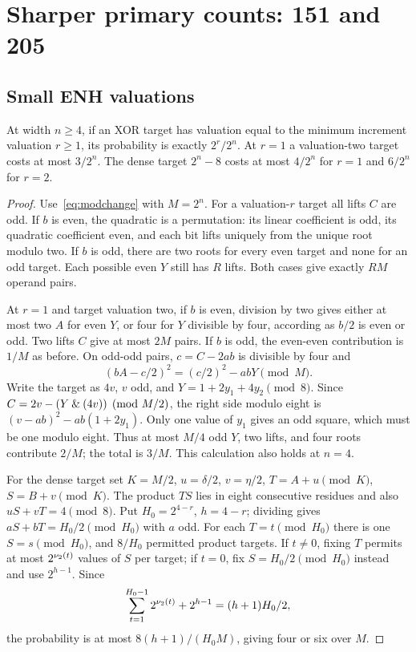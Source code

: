 \section{Sharper primary counts: 151 and 205}\label{sec:sharp}
\subsection{Small ENH valuations}
\begin{lemma}\label{lem:sharplow}
At width $n\ge4$, if an XOR target has valuation equal to the minimum increment valuation $r\ge1$, its probability is exactly $2^r/2^n$. At $r=1$ a valuation-two target costs at most $3/2^n$. The dense target $2^n-8$ costs at most $4/2^n$ for $r=1$ and $6/2^n$ for $r=2$.
\end{lemma}
\begin{proof}
Use~\eqref{eq:modchange} with $M=2^n$. For a valuation-$r$ target all lifts $C$ are odd. If $b$ is even, the quadratic is a permutation: its linear coefficient is odd, its quadratic coefficient even, and each bit lifts uniquely from the unique root modulo two. If $b$ is odd, there are two roots for every even target and none for an odd target. Each possible even $Y$ still has $R$ lifts. Both cases give exactly $RM$ operand pairs.

At $r=1$ and target valuation two, if $b$ is even, division by two gives either at most two $A$ for even $Y$, or four for $Y$ divisible by four, according as $b/2$ is even or odd. Two lifts $C$ give at most $2M$ pairs. If $b$ is odd, the even-even contribution is $1/M$ as before. On odd-odd pairs, $c=C-2ab$ is divisible by four and
\[
 (bA-c/2)^2=(c/2)^2-abY\pmod M.
\]
Write the target as $4v$, $v$ odd, and $Y=1+2y_1+4y_2\pmod8$. Since $C=2v-(Y\mathbin{\&}(4v))\pmod{M/2}$, the right side modulo eight is $(v-ab)^2-ab(1+2y_1)$. Only one value of $y_1$ gives an odd square, which must be one modulo eight. Thus at most $M/4$ odd $Y$, two lifts, and four roots contribute $2/M$; the total is $3/M$. This calculation also holds at $n=4$.

For the dense target set $K=M/2$, $u=\delta/2$, $v=\eta/2$, $T=A+u\pmod K$, $S=B+v\pmod K$. The product $TS$ lies in eight consecutive residues and also $uS+vT=4\pmod8$. Put $H_0=2^{4-r}$, $h=4-r$; dividing gives $aS+bT=H_0/2\pmod{H_0}$ with $a$ odd. For each $T=t\pmod{H_0}$ there is one $S=s\pmod{H_0}$, and $8/H_0$ permitted product targets. If $t\ne0$, fixing $T$ permits at most $2^{\nu_2(t)}$ values of $S$ per target; if $t=0$, fix $S=H_0/2\pmod{H_0}$ instead and use $2^{h-1}$. Since
\[
 \sum_{t=1}^{H_0-1}2^{\nu_2(t)}+2^{h-1}=(h+1)H_0/2,
\]
the probability is at most $8(h+1)/(H_0M)$, giving four or six over $M$.
\end{proof}

